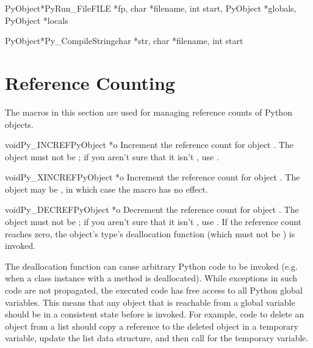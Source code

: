 \documentclass{manual}
\begin{document}
\begin{cfuncdesc}{PyObject*}{PyRun_File}{FILE *fp, char *filename,
                                         int start, PyObject *globals,
                                         PyObject *locals}
\end{cfuncdesc}

\begin{cfuncdesc}{PyObject*}{Py_CompileString}{char *str, char *filename,
                                               int start}
\end{cfuncdesc}


\chapter{Reference Counting \label{countingRefs}}

The macros in this section are used for managing reference counts
of Python objects.

\begin{cfuncdesc}{void}{Py_INCREF}{PyObject *o}
Increment the reference count for object .  The object must
not be \NULL{}; if you aren't sure that it isn't \NULL{}, use
.
\end{cfuncdesc}

\begin{cfuncdesc}{void}{Py_XINCREF}{PyObject *o}
Increment the reference count for object .  The object may be
\NULL{}, in which case the macro has no effect.
\end{cfuncdesc}

\begin{cfuncdesc}{void}{Py_DECREF}{PyObject *o}
Decrement the reference count for object .  The object must
not be \NULL{}; if you aren't sure that it isn't \NULL{}, use
.  If the reference count reaches zero, the
object's type's deallocation function (which must not be \NULL{}) is
invoked.

 The deallocation function can cause arbitrary Python
code to be invoked (e.g. when a class instance with a 
method is deallocated).  While exceptions in such code are not
propagated, the executed code has free access to all Python global
variables.  This means that any object that is reachable from a global
variable should be in a consistent state before  is
invoked.  For example, code to delete an object from a list should
copy a reference to the deleted object in a temporary variable, update
the list data structure, and then call  for the
temporary variable.
\end{cfuncdesc}
\end{document}
